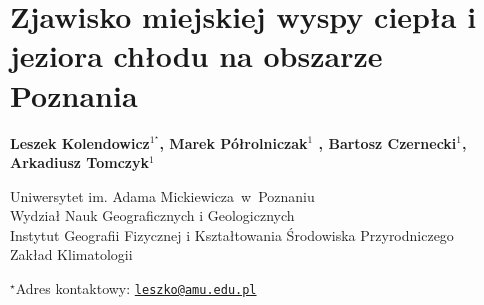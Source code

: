 \documentclass[\main/boa.tex]{subfiles}
\begin{document}
\sloppy


\section{Zjawisko miejskiej wyspy ciepła i jeziora chłodu na obszarze Poznania}

\begin{center}
  {\bf {} Leszek Kolendowicz$^{1^\star}$,  Marek Półrolniczak$^{1}$ ,  Bartosz Czernecki$^{1}$,   Arkadiusz Tomczyk$^{1}$}
\end{center}

\vskip 0.3cm

\begin{affiliations}
\begin{enumerate}
\begin{minipage}{0.915\textwidth}
\centering
\item Uniwersytet im. Adama Mickiewicza~w~Poznaniu \\ Wydział Nauk Geograficznych i Geologicznych  \\ Instytut Geografii Fizycznej i Kształtowania Środowiska Przyrodniczego\\
Zakład Klimatologii \\[-2pt]
\end{minipage}
\end{enumerate}
$^\star$Adres kontaktowy: \href{mailto:leszko@amu.edu.pl}{\nolinkurl{leszko@amu.edu.pl}}\\
\end{affiliations}

\vskip 0.5cm


\vskip 0.5cm
\end{document}
